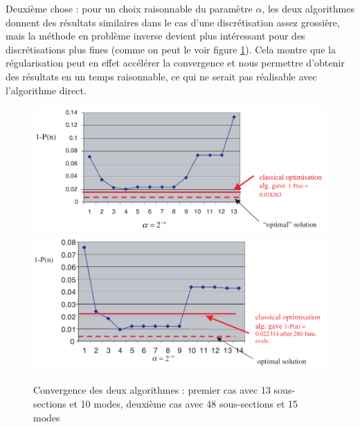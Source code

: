 \documentclass{article}
\begin{document}
Deuxième chose : pour un choix raisonnable du paramètre $\alpha$, les deux algorithmes donnent des résultats similaires dans le cas d'une discrétisation assez grossière, mais la méthode en problème inverse devient plus intéressant pour des discrétisations plus fines (comme on peut le voir figure \ref{fig:accConv}). Cela montre que la régularisation peut en effet accélérer la convergence et nous permettre d'obtenir des résultats en un temps raisonnable, ce qui ne serait pas réalisable avec l'algorithme direct. 
\begin{figure}[!h]
	\centering
	\includegraphics[scale=0.35]{images/convAlgo13.png}
	\includegraphics[scale=0.35]{images/convAlgo48.png}
	\caption{Convergence des deux algorithmes : premier cas avec 13 sous-sections et 10 modes, deuxième cas avec 48 sous-sections et 15 modes}
	\label{fig:accConv}
\end{figure}
\end{document}
